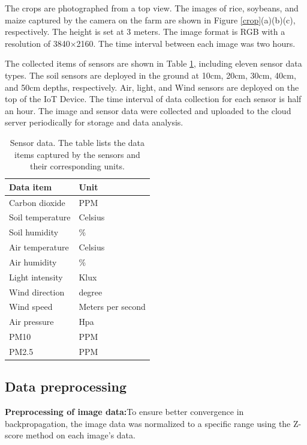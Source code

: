 \documentclass[acmsmall, screen]{acmart}
\begin{document}
The crops are photographed from a top view. The images of rice, soybeans, and maize captured by the camera on the farm are shown in Figure \ref{crop}(a)(b)(c), respectively. The height is set at 3 meters. The image format is RGB with a resolution of 3840×2160. The time interval between each image was two hours.


The collected items of sensors are shown in Table \ref{tab:sensor_and_data_items}, including eleven sensor data types. The soil sensors are deployed in the ground at 10cm, 20cm, 30cm, 40cm, and 50cm depths, respectively. Air, light, and Wind sensors are deployed on the top of the IoT Device. The time interval of data collection for each sensor is half an hour. The image and sensor data were collected and uploaded to the cloud server periodically for storage and data analysis.



\begin{table}
  \caption{Sensor data. The table lists the data items captured by the sensors and their corresponding units.}
  \label{tab:sensor_and_data_items}
  \begin{tabular}{ll}
    \hline
    Data item        & Unit              \\
    \hline
    Carbon dioxide   & PPM               \\
    Soil temperature & Celsius           \\
    Soil humidity    & \%                \\
    Air temperature  & Celsius           \\
    Air humidity     & \%                \\
    Light intensity  & Klux              \\
    Wind direction   & degree            \\
    Wind speed       & Meters per second \\
    Air pressure     & Hpa               \\
    PM10             & PPM               \\
    PM2.5            & PPM               \\
    \hline
  \end{tabular}%
\end{table}

\subsection{Data preprocessing}
\textbf{Preprocessing of image data:}To ensure better convergence in backpropagation, the image data was normalized to a specific range using the Z-score method on each image's data.
\end{document}
